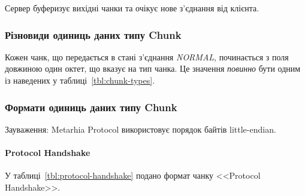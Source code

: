 Сервер буферизує вихідні чанки та очікує нове з'єднання від клієнта.

\subsubsection{Різновиди одиниць даних типу Chunk}

Кожен чанк, що передається в стані з'єднання \emph{NORMAL}, починається з поля
довжиною один октет, що вказує на тип чанка.  Це значення \emph{повинно} бути
одним із наведених у таблиці~\ref{tbl:chunk-types}.

\begin{table}[htbp]
\end{table}

\subsubsection{Формати одиниць даних типу Chunk}

Зауваження: Metarhia Protocol використовує порядок байтів little-endian.

\paragraph{Protocol Handshake}

У таблиці~\ref{tbl:protocol-handshake} подано формат чанку <<Protocol Handshake>>.

\begin{table}[htbp]
\end{table}

